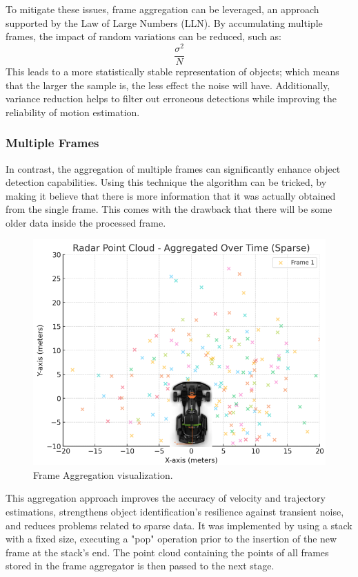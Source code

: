 To mitigate these issues, frame aggregation can be leveraged, an approach supported by the Law of Large Numbers (LLN). By accumulating multiple frames, the impact of random variations can be reduced, such as:
\begin{equation}
    \frac{\sigma^2}{N}
    \label{eq:variance_per_sample_size}
\end{equation}
This leads to a more statistically stable representation of objects; which means that the larger the sample is, the less effect the noise will have. Additionally, variance reduction helps to filter out erroneous detections while improving the reliability of motion estimation.

\subsubsection{Multiple Frames}
In contrast, the aggregation of multiple frames can significantly enhance object detection capabilities.
Using this technique the algorithm can be tricked, by making it believe that there is more information that it was actually obtained from the single frame. This comes with the drawback that there will be some older data inside the processed frame.
\begin{figure}[!htbp]
    \centering
    \includegraphics[width=0.5\linewidth]{images/multiframe.png}
    \caption{Frame Aggregation visualization.}
    \label{fig: Frame Aggregation visualization}
\end{figure}

This aggregation approach improves the accuracy of velocity and trajectory estimations, strengthens object identification's resilience against transient noise, and reduces problems related to sparse data.
It was implemented by using a stack with a fixed size, executing a "pop" operation prior to the insertion of the new frame at the stack's end.
The point cloud containing the points of all frames stored in the frame aggregator is then passed to the next stage.